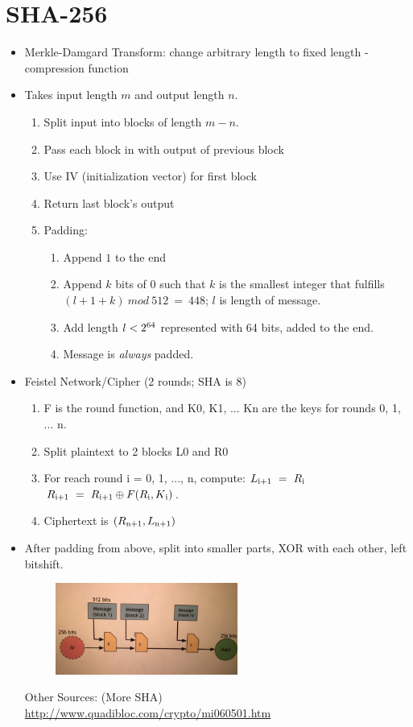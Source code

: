 \documentclass{article}
\begin{document}
\section*{SHA-256}
\begin{itemize}
  \item Merkle-Damgard Transform: change arbitrary length to fixed length - compression function
  \item Takes input length $m$ and output length $n$.
    \begin{enumerate}
      \item Split input into blocks of length $m-n$.
      \item Pass each block in with output of previous block
      \item Use IV (initialization vector) for first block
      \item Return last block's output
      \item Padding: 
        \begin{enumerate}
          \item Append $1$ to the end
          \item Append $k$ bits of $0$ such that $k$ is the smallest integer that fulfills $(l + 1 + k)\ mod\ 512\ =\ 448$; $l$ is length of message.
          \item Add length $l < 2\textsuperscript{64}$ represented with 64 bits, added to the end.
          \item Message is \emph{always} padded.
        \end{enumerate}
    \end{enumerate}
  \item Feistel Network/Cipher (2 rounds; SHA is 8)
    \begin{enumerate}
      \item F is the round function, and K0, K1, ... Kn are the keys for rounds 0, 1, ... n. 
      \item Split plaintext to 2 blocks L0 and R0
      \item For reach round i = 0, 1, ..., n, compute:
        \subitem $L\textsubscript{i+1}\ =\ R\textsubscript{i}$
        \subitem $R\textsubscript{i+1}\ =\ R\textsubscript{i+1} \oplus F(R\textsubscript{i}, K\textsubscript{i})$.
      \item Ciphertext is $(R\textsubscript{n+1}, L\textsubscript{n+1})$
    \end{enumerate}
  \item After padding from above, split into smaller parts, XOR with each other, left bitshift.
    \begin{center}
      \includegraphics[width=8cm, height=3cm]{sha.jpg}
    \end{center}
    Other Sources: (More SHA) \url{http://www.quadibloc.com/crypto/mi060501.htm}
\end{itemize}
\end{document}
